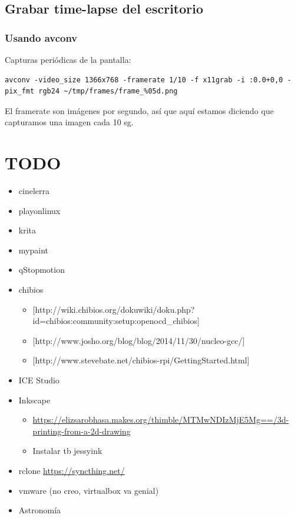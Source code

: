 \documentclass[12pt,spanish,]{scrartcl}
\providecommand{\tightlist}{%
  \setlength{\itemsep}{0pt}\setlength{\parskip}{0pt}}
\begin{document}
\subsection{Grabar time-lapse del
escritorio}\label{grabar-time-lapse-del-escritorio}

\subsubsection{Usando avconv}\label{usando-avconv}

Capturas periódicas de la pantalla:

\begin{verbatim}
avconv -video_size 1366x768 -framerate 1/10 -f x11grab -i :0.0+0,0 -pix_fmt rgb24 ~/tmp/frames/frame_%05d.png
\end{verbatim}

El framerate son imágenes por segundo, así que aquí estamos diciendo que
capturamos una imagen cada 10 sg.

\section{TODO}\label{todo-1}

\begin{itemize}
\tightlist
\item
  cinelerra
\item
  playonlinux
\item
  krita
\item
  mypaint
\item
  qStopmotion
\item
  chibios

  \begin{itemize}
  \tightlist
  \item
    {[}http://wiki.chibios.org/dokuwiki/doku.php?id=chibios:community:setup:openocd\_chibios{]}
  \item
    {[}http://www.josho.org/blog/blog/2014/11/30/nucleo-gcc/{]}
  \item
    {[}http://www.stevebate.net/chibios-rpi/GettingStarted.html{]}
  \end{itemize}
\item
  ICE Studio
\item
  Inkscape

  \begin{itemize}
  \tightlist
  \item
    \url{https://elizsarobhasa.makes.org/thimble/MTMwNDIzMjE5Mg==/3d-printing-from-a-2d-drawing}
  \item
    Instalar tb jessyink
  \end{itemize}
\item
  rclone \url{https://syncthing.net/}
\item
  vmware (no creo, virtualbox va genial)
\item
  Astronomía
\end{itemize}
\end{document}
